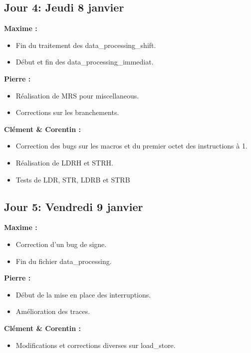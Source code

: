 \documentclass[11pt]{article} %
\begin{document}
\subsection{Jour 4: Jeudi 8 janvier}
\textbf{Maxime :}
\begin{itemize}
  \item Fin du traitement des data\_processing\_shift.
  \item Début et fin des data\_processing\_immediat.
\end{itemize}
\textbf{Pierre :}
\begin{itemize}
  \item R\'ealisation de MRS pour miscellaneous.
  \item Corrections sur les branchements.
\end{itemize}
\textbf{Cl\'ement \& Corentin :}
\begin{itemize}
  \item Correction des bugs sur les macros et du premier octet des instructions \`a 1.
  \item R\'ealisation de LDRH et STRH.
  \item Tests de LDR, STR, LDRB et STRB
\end{itemize}

\subsection{Jour 5: Vendredi 9  janvier}
\textbf{Maxime :}
\begin{itemize}
  \item Correction d'un bug de signe.
  \item Fin du fichier data\_processing.
\end{itemize}
\textbf{Pierre :}
\begin{itemize}
  \item Début de la mise en place des interruptions.
  \item Am\'elioration des traces.
\end{itemize}
\textbf{Cl\'ement \& Corentin :}
\begin{itemize}
  \item Modifications et corrections diverses sur load\_store.
\end{itemize}
\end{document}
